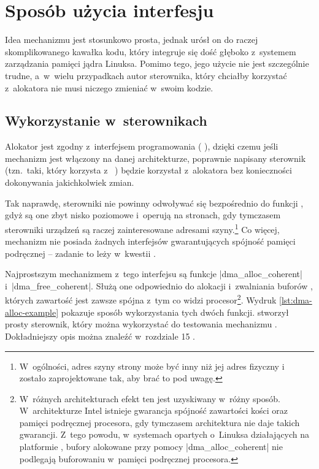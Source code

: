 \chapter{Sposób użycia interfesju }\label{sec:cma-usage}

Idea mechanizmu  jest stosunkowo prosta, jednak urósł on do
raczej skomplikowanego kawałka kodu, który integruje się dość głęboko
z~systemem zarządzania pamięci jądra Linuksa.  Pomimo tego, jego
użycie nie jest szczególnie trudne, a~w~wielu przypadkach autor
sterownika, który chciałby korzystać z~alokatora  nie musi
niczego zmieniać w~swoim kodzie.

\section{Wykorzystanie w~sterownikach}\label{sec:usage-drivers}

Alokator  jest zgodny z~interfejsem programowania 
( ), dzięki czemu jeśli mechanizm  jest
włączony na danej architekturze, poprawnie napisany sterownik
(tzn.\ taki, który korzysta z~ ) będzie korzystał
z~alokatora  bez konieczności dokonywania jakichkolwiek
zmian.

Tak naprawdę, sterowniki nie powinny odwoływać się bezpośrednio do
funkcji , gdyż są one zbyt nisko poziomowe i~operują na stronach,
gdy tymczasem sterowniki urządzeń są raczej zainteresowane adresami
szyny.\footnote{W~ogólności, adres szyny strony może być inny niż jej
  adres fizyczny i~  zostało zaprojektowane tak, aby brać to pod
  uwagę.}  Co więcej, mechanizm  nie posiada żadnych interfejsów
gwarantujących spójność pamięci podręcznej -- zadanie to leży
w~kwestii  .

Najprostszym mechanizmem z~tego interfejsu są funkcje
\code|dma_alloc_coherent| i~\code|dma_free_coherent|.  Służą one
odpowiednio do alokacji i~zwalniania buforów , których zawartość
jest zawsze spójna z~tym co widzi procesor\footnote{W~różnych
  architekturach efekt ten jest uzyskiwany w~różny sposób.
  W~architekturze Intel istnieje gwarancja spójność zawartości kości
   oraz pamięci podręcznej procesora, gdy tymczasem architektura
   nie daje takich gwarancji.  Z~tego powodu, w~systemach opartych
  o~Linuksa działających na platformie , bufory alokowane przy
  pomocy \code|dma_alloc_coherent| nie podlegają buforowaniu w~pamięci
  podręcznej procesora.}.  Wydruk \ref{lst:dma-alloc-example} pokazuje
sposób wykorzystania tych dwóch funkcji.  \textcite{patch:cma-test}
stworzył prosty sterownik, który można wykorzystać do testowania
mechanizmu .  Dokładniejszy opis   można znaleźć w~rozdziale
15 \autocite{bib:ldd3}.

